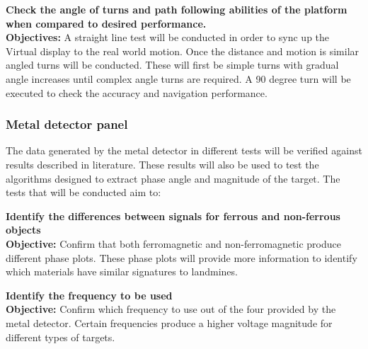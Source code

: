 \documentclass[main.tex]{subfiles}
\begin{document}
\begin{appendices}
\begin{qb}
\textbf{Check the angle of turns and path following abilities of the platform when compared to desired performance.}\\
\textbf{Objectives:} A straight line test will be conducted in order to sync up the Virtual display to the real world motion. Once the distance and motion is similar angled turns will be conducted. These will first be simple turns with gradual angle increases until complex angle turns are required. A 90 degree turn will be executed to check the accuracy and navigation performance.

\end{qb}


\subsubsection{Metal detector panel}
The data generated by the metal detector in different tests will be verified against results described in literature. These results will also be used to test the algorithms designed to extract phase angle and magnitude of the target. The tests that will be conducted aim to:
\begin{mds}
\textbf{Identify the differences between signals for ferrous and non-ferrous objects}\\
\textbf{Objective:} Confirm that both ferromagnetic and non-ferromagnetic produce different phase plots. These phase plots will provide more information to identify which materials have similar signatures to landmines. 

\end{mds}

\begin{mds}
\textbf{Identify the frequency to be used}\\
\textbf{Objective:} Confirm which frequency to use out of the four provided by the metal detector. Certain frequencies produce a higher voltage magnitude for different types of targets.  


\end{mds}
\end{appendices}
\end{document}
